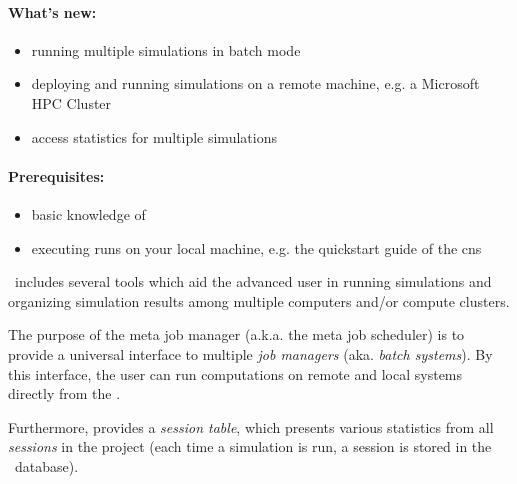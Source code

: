 
\graphicspath{{MetaJobManager/MetaJobManager.texbatch/}}

\paragraph{What's new:} 
\begin{itemize}
	\item running multiple simulations in batch mode
	\item deploying and running simulations on a remote machine, e.g. a Microsoft HPC Cluster
	\item access statistics for multiple simulations
\end{itemize}

\paragraph{Prerequisites:} 
\begin{itemize}
	\item basic knowledge of \BoSSSpad{}
	\item executing runs on your local machine, e.g. the quickstart guide of the \ac{cns}
\end{itemize}

\BoSSS ~includes several tools which aid the advanced user in running simulations and organizing simulation results among multiple computers and/or compute clusters.


The purpose of the meta job manager (a.k.a. the meta job scheduler)
is to provide a universal interface to multiple \emph{job managers} (aka. \emph{batch systems}).
By this interface, the user can run computations on remote and local systems directly from the \BoSSSpad{}.

Furthermore, \BoSSSpad{}  provides a \emph{session table},
which presents various statistics from all \emph{sessions} in the project
(each time a simulation is run, a session is stored in the \BoSSS ~database).

